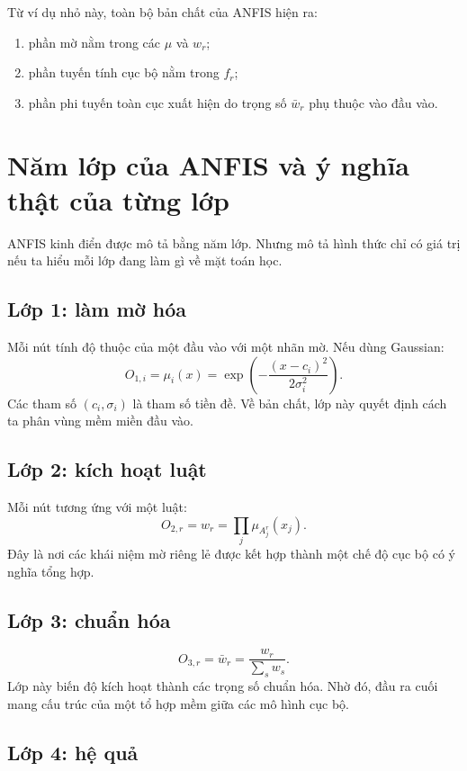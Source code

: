 Từ ví dụ nhỏ này, toàn bộ bản chất của ANFIS hiện ra:

\begin{enumerate}
\item phần mờ nằm trong các \(\mu\) và \(w_r\);
\item phần tuyến tính cục bộ nằm trong \(f_r\);
\item phần phi tuyến toàn cục xuất hiện do trọng số \(\bar{w}_r\) phụ thuộc vào đầu vào.
\end{enumerate}

\section{Năm lớp của ANFIS và ý nghĩa thật của từng lớp}

ANFIS kinh điển được mô tả bằng năm lớp. Nhưng mô tả hình thức chỉ có giá trị nếu ta hiểu mỗi lớp đang làm gì về mặt toán học.

\subsection{Lớp 1: làm mờ hóa}

Mỗi nút tính độ thuộc của một đầu vào với một nhãn mờ. Nếu dùng Gaussian:
\[
O_{1,i}=\mu_i(x)=\exp\left(-\frac{(x-c_i)^2}{2\sigma_i^2}\right).
\]
Các tham số \((c_i,\sigma_i)\) là tham số tiền đề. Về bản chất, lớp này quyết định cách ta phân vùng mềm miền đầu vào.

\subsection{Lớp 2: kích hoạt luật}

Mỗi nút tương ứng với một luật:
\[
O_{2,r}=w_r=\prod_j \mu_{A_j^r}(x_j).
\]
Đây là nơi các khái niệm mờ riêng lẻ được kết hợp thành một chế độ cục bộ có ý nghĩa tổng hợp.

\subsection{Lớp 3: chuẩn hóa}

\[
O_{3,r}=\bar{w}_r=\frac{w_r}{\sum_s w_s}.
\]
Lớp này biến độ kích hoạt thành các trọng số chuẩn hóa. Nhờ đó, đầu ra cuối mang cấu trúc của một tổ hợp mềm giữa các mô hình cục bộ.

\subsection{Lớp 4: hệ quả}

